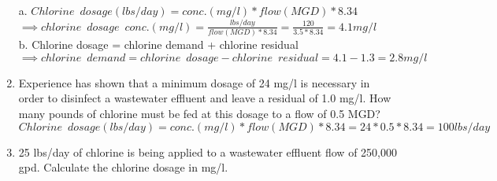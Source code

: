 \documentclass{article}
\begin{document}
\begin{enumerate}
a. $Chlorine \enspace dosage (lbs/day)=conc. (mg/l)*flow(MGD)*8.34$\\
\vspace{0.25cm}
$\implies chlorine \enspace dosage \enspace conc. (mg/l)=\frac{lbs/day}{flow(MGD)*8.34}=\frac{120}{3.5*8.34}=\boxed{4.1mg/l}$\\
\vspace{0.25cm}
b. Chlorine dosage = chlorine demand + chlorine residual\\
\vspace{0.25cm}
$ \implies chlorine \enspace demand = chlorine \enspace dosage - chlorine \enspace residual=4.1-1.3=\boxed{2.8mg/l}$\\
\vspace{0.25cm}

\item Experience has shown that a minimum dosage of 24 mg/l is necessary in order to disinfect a wastewater effluent and leave a residual of 1.0 mg/l. How many pounds of chlorine must be fed at this dosage to a flow of 0.5 MGD?\\

$Chlorine \enspace dosage (lbs/day)=conc. (mg/l)*flow(MGD)*8.34=24*0.5*8.34=\boxed{100lbs/day}$\\
\vspace{0.25cm}
\item 25 lbs/day of chlorine is being applied to a wastewater effluent flow of 250,000 gpd. Calculate the chlorine dosage in mg/l.\\


\end{enumerate}
\end{document}
